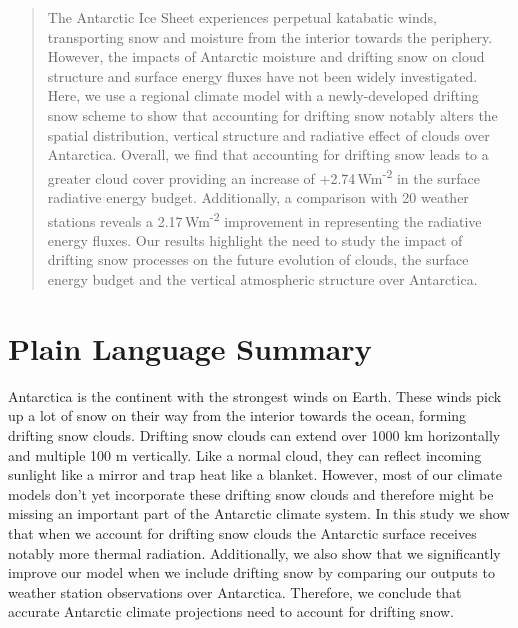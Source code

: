 \documentclass[draft]{agujournal2019}
\begin{document}

\begin{abstract}
The Antarctic Ice Sheet experiences perpetual katabatic winds, transporting snow and moisture from the interior towards the periphery. However, the impacts of Antarctic moisture and drifting snow on cloud structure and surface energy fluxes have not been widely investigated. Here, we use a regional climate model with a newly-developed drifting snow scheme to show that accounting for drifting snow notably alters the spatial distribution, vertical structure and radiative effect of clouds over Antarctica. Overall, we find that accounting for drifting snow leads to a greater cloud cover providing an increase of +2.74\,Wm\textsuperscript{-2} in the surface radiative energy budget. Additionally, a comparison with 20 weather stations reveals a 2.17\,Wm\textsuperscript{-2} improvement in representing the radiative energy fluxes. Our results highlight the need to study the impact of drifting snow processes on the future evolution of clouds, the surface energy budget and the vertical atmospheric structure over Antarctica.
\end{abstract}

\section*{Plain Language Summary}
Antarctica is the continent with the strongest winds on Earth. These winds pick up a lot of snow on their way from the interior towards the ocean, forming drifting snow clouds. Drifting snow clouds can extend over 1000 km horizontally and multiple 100 m vertically. Like a normal cloud, they can reflect incoming sunlight like a mirror and trap heat like a blanket. However, most of our climate models don't yet incorporate these drifting snow clouds and therefore might be missing an important part of the Antarctic climate system. In this study we show that when we account for drifting snow clouds the Antarctic surface receives notably more thermal radiation. Additionally, we also show that we significantly improve our model when we include drifting snow by comparing our outputs to weather station observations over Antarctica. Therefore, we conclude that accurate Antarctic climate projections need to account for drifting snow.


%
%
\end{document}

